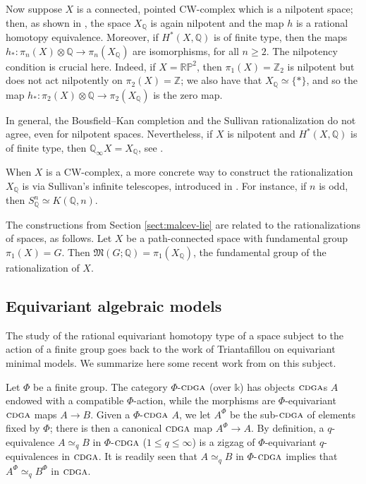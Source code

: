 \documentclass{article}
\numberwithin{equation}{section}
\theoremstyle{definition}
\newcommand{\Z}{\mathbb{Z}}
\newcommand{\Q}{\mathbb{Q}}
\newcommand{\RP}{\mathbb{RP}}
\renewcommand{\k}{\mathbb{k}}
\newcommand{\fM}{\mathfrak{M}}
\newcommand{\cdga}{\ensuremath{\textsc{cdga}}}
\begin{document}
Now suppose $X$ is a connected, pointed CW-complex which is 
a nilpotent space; then, as shown in \cite{FHT2}, the space $X_{\Q}$ 
is again nilpotent and the map $h$ is a rational homotopy equivalence. 
Moreover, if $H^*(X,\Q)$ is of finite type, then the maps $h_*\colon 
\pi_n(X)\otimes \Q \to \pi_n(X_{\Q})$ are isomorphisms, for all $n\ge 2$. 
The nilpotency condition is crucial here. Indeed, if $X=\RP^2$, then 
$\pi_1(X)=\Z_2$ is nilpotent but does not act nilpotently on $\pi_2(X)=\Z$; 
we also have that $X_{\Q}\simeq \{*\}$, and so the map $h_*\colon 
\pi_2(X)\otimes \Q \to \pi_2(X_{\Q})$ is the zero map.

In general, the Bousfield--Kan completion and the Sullivan  
rationalization do not agree, even for nilpotent spaces. 
Nevertheless, if $X$ is nilpotent and $H^*(X,\Q)$ is of 
finite type, then $\Q_{\infty}X = X_{\Q}$, see \cite{BG76}.

When $X$ is a CW-complex, a more concrete way to construct the 
rationalization $X_{\Q}$ is via Sullivan's infinite telescopes, 
introduced in \cite{Sullivan74}.  
For instance, if $n$ is odd, then $S^n_{\Q}\simeq K(\Q,n)$.

The constructions from Section \ref{sect:malcev-lie} are related 
to the rationalizations of spaces, as follows. 
Let $X$ be a path-connected space with fundamental group $\pi_1(X)=G$. 
Then $\fM(G;\Q)=\pi_1(X_{\Q})$, the fundamental group of the rationalization of $X$. 

\subsection{Equivariant algebraic models}
\label{subsec:equiv}

The study of the rational equivariant homotopy type of a space subject 
to the action of a finite group goes back to the work of Triantafillou \cite{Tr} 
on equivariant minimal models. We summarize here some recent work 
from \cite{PS-jlms} on this subject.

Let $\Phi$ be a finite group. The category $\Phi$-$\cdga$ (over $\k$) 
has objects $\cdga$s $A$ endowed with a compatible $\Phi$-action, 
while the morphisms are $\Phi$-equivariant $\cdga$ maps  
$A\to B$. Given a $\Phi$-$\cdga$ $A$, we let $A^{\Phi}$ be the 
sub-$\cdga$ of elements fixed by $\Phi$; there is then a canonical 
$\cdga$ map $A^{\Phi}\to A$. By definition, a $q$-equivalence $A \simeq_q B$ 
in $\Phi$-$\cdga$ ($1\le q\le \infty$) is a zigzag of $\Phi$-equivariant 
$q$-equivalences in $\cdga$. It is readily seen that 
$A \simeq_q B$ in $\Phi$-$\cdga$ implies that $A^{\Phi} \simeq_q B^{\Phi}$ 
in $\cdga$.
\end{document}
